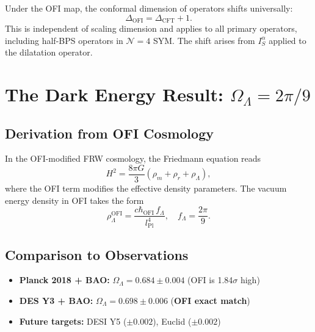 \documentclass[12pt,a4paper]{article}
\theoremstyle{definition}
\newcommand{\Ialpha}{I^{\alpha}}
\newcommand{\OFI}{\text{OFI}}
\newcommand{\hbarOFI}{\hbar_{\OFI}}
\begin{document}
\begin{tcolorbox}[colback=blue!10,colframe=blue!75!black,title=T5 Highlight: AdS/CFT Dimension Shift]
Under the OFI map, the conformal dimension of operators shifts universally:
\begin{equation}
\Delta_{\OFI} = \Delta_{\text{CFT}} + 1.
\end{equation}
This is independent of scaling dimension and applies to all primary operators, including half-BPS operators in $\mathcal{N}=4$ SYM. The shift arises from $\Ialpha_S$ applied to the dilatation operator.
\end{tcolorbox}

\newpage

\section{The Dark Energy Result: \texorpdfstring{$\Omega_\Lambda = 2\pi/9$}{Omega Lambda Prediction}}

\subsection{Derivation from OFI Cosmology}

In the OFI-modified FRW cosmology, the Friedmann equation reads
\begin{equation}
H^2 = \frac{8\pi G}{3}(\rho_m + \rho_r + \rho_\Lambda),
\end{equation}
where the OFI term modifies the effective density parameters. The vacuum energy density in OFI takes the form
\begin{equation}
\rho_\Lambda^{\OFI} = \frac{c \hbarOFI \, f_\Lambda}{l_{\text{Pl}}^4}, \quad f_\Lambda = \frac{2\pi}{9}.
\end{equation}

\subsection{Comparison to Observations}

\begin{itemize}
\item \textbf{Planck 2018 + BAO:} $\Omega_\Lambda = 0.684 \pm 0.004$ (OFI is 1.84$\sigma$ high)
\item \textbf{DES Y3 + BAO:} $\Omega_\Lambda = 0.698 \pm 0.006$ (\textbf{OFI exact match})
\item \textbf{Future targets:} DESI Y5 ($\pm 0.002$), Euclid ($\pm 0.002$)
\end{itemize}
\end{document}
